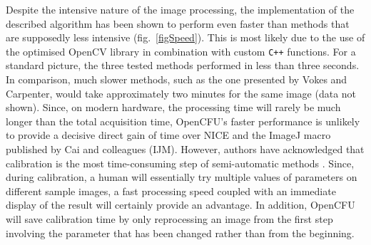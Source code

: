 \documentclass[10pt]{article}
\newcommand{\IJM}{IJM}
\begin{document}
Despite the intensive nature of the image processing, the implementation of the described algorithm has
been shown to perform even faster than methods that are supposedly less intensive
\cite{clarke_lowcost_2010,cai_optimized_2011} (fig.~\ref{figSpeed}). This is most
likely due to the use of the optimised OpenCV library\cite{opencv_library} in
combination with custom \texttt{C++} functions.
For a standard picture, the three tested methods performed in less than three
seconds. In comparison, much slower methods, such as the one presented by Vokes
and Carpenter\cite{vokes_using_2008}, would take approximately two minutes for
the same image (data not shown).
Since, on modern hardware, the processing time will rarely be much longer than
the total acquisition time, OpenCFU's faster performance is unlikely to provide
a decisive direct gain of time over NICE\cite{clarke_lowcost_2010} and
the ImageJ macro published by Cai
and colleagues (\IJM{})\cite{cai_optimized_2011}.
However, authors have acknowledged that calibration is the most time-consuming
step of semi-automatic methods \cite{vokes_using_2008,cai_optimized_2011}.
Since, during calibration, a human will essentially try multiple values of
parameters on different sample images, a fast processing speed coupled with an
immediate display of the result will certainly provide an advantage. In
addition, OpenCFU will save calibration time by only reprocessing an image from
the first step involving the parameter that has been changed rather than from
the beginning.
\end{document}
